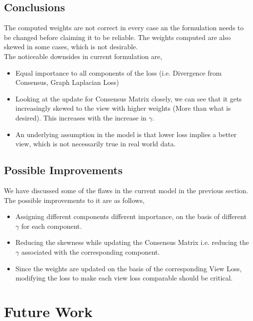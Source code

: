 \documentclass[a4paper]{article}
\begin{document}
	\subsection{Conclusions}
	
	The computed weights are not correct in every case an the formulation needs to be changed before claiming it to be reliable. The weights computed are also skewed in some cases, which is not desirable.\\
	The noticeable downsides in current formulation are, 
	\begin{itemize}
	\item Equal importance to all components of the loss (i.e. Divergence from Consensus, Graph Laplacian Loss)
	\item Looking at the update for Consensus Matrix closely, we can see that it gets increasingly skewed to the view with higher weights (More than what is desired). This increases with the increase in $\gamma$. 
	\item An underlying assumption in the model is that lower loss implies a better view, which is not necessarily true in real world data.
	\end{itemize}
	
	\subsection{Possible Improvements}
	
	We have discussed some of the flaws in the current model in the previous section. The possible improvements to it are as follows,
	\begin{itemize}
	\item Assigning different components different importance, on the basis of different $\gamma$ for each component.
	\item Reducing the skewness while updating the Consensus Matrix i.e. reducing the $\gamma$ associated with the corresponding component.
	\item Since the weights are updated on the basis of the corresponding View Loss, modifying the loss to make each view loss comparable should be critical.
	\end{itemize}
	
	\section{Future Work}	
	
\end{document}
